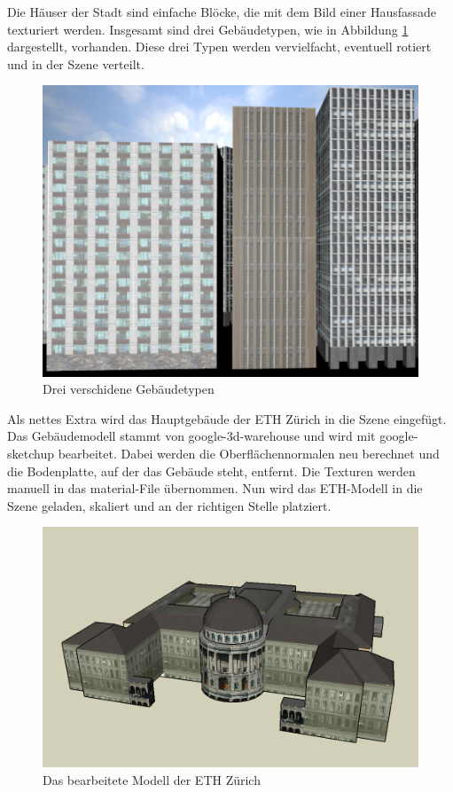 Die Häuser der Stadt sind einfache Blöcke, die mit dem Bild einer Hausfassade texturiert werden. Insgesamt sind drei Gebäudetypen, wie in Abbildung \ref{screenshot_buildings} dargestellt,  vorhanden. Diese drei Typen werden vervielfacht, eventuell rotiert und in der Szene verteilt.\\
\begin{figure}[H]
\centering 
\includegraphics[scale=0.4]{src/screenshot_buildings.png}
\caption{Drei verschidene Gebäudetypen} %
\label{screenshot_buildings} %
\end{figure}
Als nettes Extra wird das Hauptgebäude der ETH Zürich in die Szene eingefügt. Das Gebäudemodell stammt von \gls{google-3d-warehouse} und wird mit \gls{google-sketchup} bearbeitet. Dabei werden die Oberflächennormalen neu berechnet und die Bodenplatte, auf der das Gebäude steht, entfernt. Die Texturen werden manuell in das material-File übernommen. Nun wird das ETH-Modell in die Szene geladen, skaliert und an der richtigen Stelle platziert. 

\begin{figure}[H]
\centering 
\includegraphics[width=1\linewidth]{src/screenshot_googlesketchup.png}
\caption{Das bearbeitete Modell der ETH Zürich} %
\label{googlesketchup_eth} %
\end{figure}


